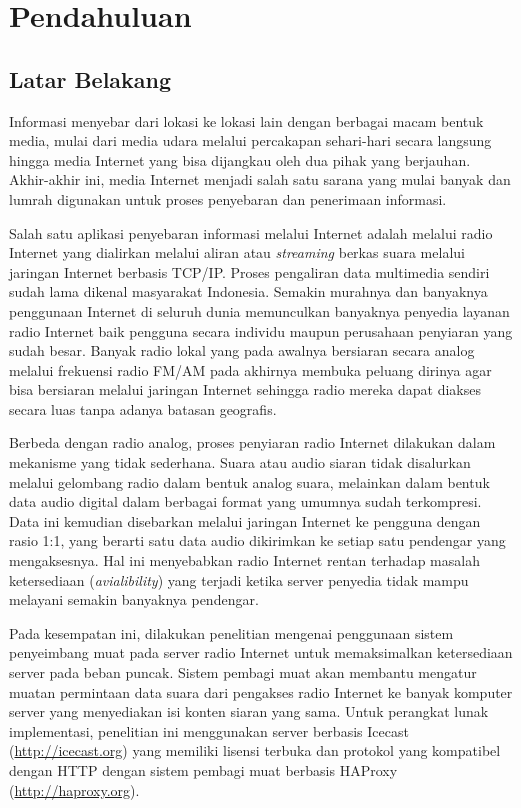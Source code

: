 \chapter{Pendahuluan}

\section{Latar Belakang}

Informasi menyebar dari lokasi ke lokasi lain dengan berbagai macam bentuk media, mulai dari media udara melalui percakapan sehari-hari secara langsung hingga media Internet yang bisa dijangkau oleh dua pihak yang berjauhan. Akhir-akhir ini, media Internet menjadi salah satu sarana yang mulai banyak dan lumrah digunakan untuk proses penyebaran dan penerimaan informasi.

Salah satu aplikasi penyebaran informasi melalui Internet adalah melalui radio Internet yang dialirkan melalui aliran atau \textit{streaming} berkas suara melalui jaringan Internet berbasis TCP/IP. Proses pengaliran data multimedia sendiri sudah lama dikenal masyarakat Indonesia. Semakin murahnya dan banyaknya penggunaan Internet di seluruh dunia memunculkan banyaknya penyedia layanan radio Internet baik pengguna secara individu maupun perusahaan penyiaran yang sudah besar. Banyak radio lokal yang pada awalnya bersiaran secara analog melalui frekuensi radio FM/AM pada akhirnya membuka peluang dirinya agar bisa bersiaran melalui jaringan Internet sehingga radio mereka dapat diakses secara luas tanpa adanya batasan geografis. 

Berbeda dengan radio analog, proses penyiaran radio Internet dilakukan dalam mekanisme yang tidak sederhana. Suara atau audio siaran tidak disalurkan melalui gelombang radio dalam bentuk analog suara, melainkan dalam bentuk data audio digital dalam berbagai format yang umumnya sudah terkompresi. Data ini kemudian disebarkan melalui jaringan Internet ke pengguna dengan rasio 1:1, yang berarti satu data audio dikirimkan ke setiap satu pendengar yang mengaksesnya. Hal ini menyebabkan radio Internet rentan terhadap masalah ketersediaan (\textit{avialibility}) yang terjadi ketika server penyedia tidak mampu melayani semakin banyaknya pendengar.

Pada kesempatan ini, dilakukan penelitian mengenai penggunaan sistem penyeimbang muat pada server radio Internet untuk memaksimalkan ketersediaan server pada beban puncak. Sistem pembagi muat akan membantu mengatur muatan permintaan data suara dari pengakses radio Internet ke banyak komputer server yang menyediakan isi konten siaran yang sama. Untuk perangkat lunak implementasi, penelitian ini menggunakan server berbasis Icecast (\url{http://icecast.org}) yang memiliki lisensi terbuka dan protokol yang kompatibel dengan HTTP dengan sistem pembagi muat berbasis HAProxy (\url{http://haproxy.org}).

